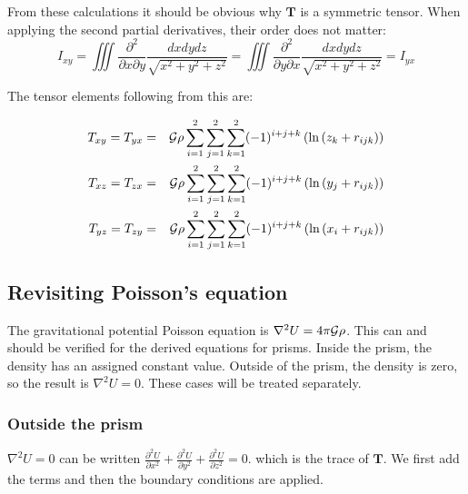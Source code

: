 From these calculations it should be obvious why ${\bm T}$ is a symmetric tensor. 
When applying the second partial derivatives, their order does not matter: 
\begin{equation}
I_{xy} 
=\iiint \frac{\partial^2}{\partial x \partial y} \frac{dx dy dz}{\sqrt{x^2+y^2+z^2}} 
=\iiint \frac{\partial^2}{\partial y \partial x} \frac{dx dy dz}{\sqrt{x^2+y^2+z^2}} 
= I_{yx}
\end{equation}

The tensor elements following from this are:
\begin{mdframed}[backgroundcolor=blue!5]
\begin{eqnarray}
T_{xy} = T_{yx} 
&=& 
{\cal G}  \rho \sum_{i=1}^{2} \sum_{j=1}^{2} \sum_{k=1}^{2} (-1)^{i+j+k} 
\left( \ln{\left( z_k + r_{ijk} \right)} \right) \nonumber\\
T_{xz} = T_{zx} 
&=& 
{\cal G}  \rho \sum_{i=1}^{2} \sum_{j=1}^{2} \sum_{k=1}^{2} (-1)^{i+j+k} 
\left( \ln{\left( y_j + r_{ijk} \right)} \right) \nonumber\\
T_{yz} = T_{zy} 
&=& 
{\cal G}  \rho \sum_{i=1}^{2} \sum_{j=1}^{2} \sum_{k=1}^{2} (-1)^{i+j+k} 
\left(\ln{\left( x_i + r_{ijk} \right)} \right) \nonumber
\end{eqnarray}
\end{mdframed}


\subsection{Revisiting Poisson's equation}

The gravitational potential Poisson equation is $\nabla^2 U = 4\pi {\cal G} \rho$. 
This can and should be verified for the derived equations for prisms. 
Inside the prism, the density has an assigned constant value. 
Outside of the prism, the density is zero, so the result is $\nabla^2 U = 0$. 
These cases will be treated separately.

\subsubsection{Outside the prism}  

$\nabla^2 U = 0$ can be written 
$\frac{\partial^2 U}{\partial x^2} + \frac{\partial^2 U}{\partial y^2}+\frac{\partial^2 U}{\partial z^2}=0$. 
which is the trace of ${\bm T}$. 
We first add the terms and then the boundary conditions are applied.

